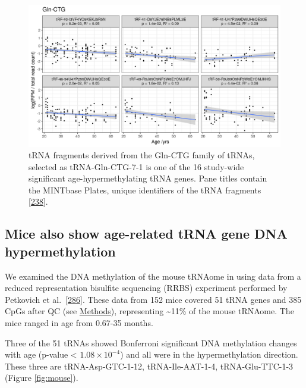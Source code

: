 \documentclass[
]{book}
\begin{document}
\begin{figure}

{\centering \includegraphics[width=1\linewidth]{./figs/nonSigIsoMapbbswsPlotsGln-CTG} 

}

\caption{tRNA fragments derived from the Gln-CTG family of tRNAs, selected as tRNA-Gln-CTG-7-1 is one of the 16 study-wide significant age-hypermethylating tRNA genes. Pane titles contain the MINTbase Plates, unique identifiers of the tRNA fragments {[}\protect\hyperlink{ref-Pliatsika2018}{238}{]}.}\label{fig:mintmapres}
\end{figure}



\hypertarget{mice-also-show-age-related-trna-gene-dna-hypermethylation}{%
\subsection{Mice also show age-related tRNA gene DNA hypermethylation}\label{mice-also-show-age-related-trna-gene-dna-hypermethylation}}

We examined the DNA methylation of the mouse tRNAome in using data from a reduced representation bisulfite sequencing (RRBS) experiment performed by Petkovich et al.~{[}\protect\hyperlink{ref-Petkovich2017}{286}{]}.
These data from 152 mice covered 51 tRNA genes and 385 CpGs after QC (see \protect\hyperlink{mousemethods}{Methods}), representing \textasciitilde11\% of the mouse tRNAome.
The mice ranged in age from 0.67-35 months.

Three of the 51 tRNAs showed Bonferroni significant DNA methylation changes with age (p-value \textless{} \(1.08 \times 10^{-4}\)) and all were in the hypermethylation direction.
These three are tRNA-Asp-GTC-1-12, tRNA-Ile-AAT-1-4, tRNA-Glu-TTC-1-3 (Figure \ref{fig:mouse}).
\end{document}
